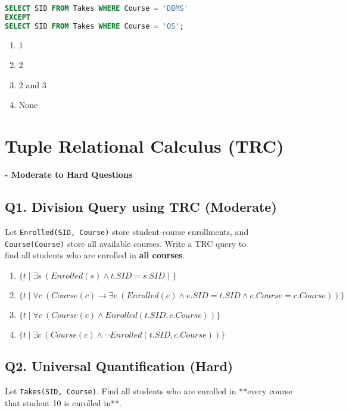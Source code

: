 \begin{lstlisting}[language=SQL]
SELECT SID FROM Takes WHERE Course = 'DBMS'
EXCEPT
SELECT SID FROM Takes WHERE Course = 'OS';
\end{lstlisting}

\begin{enumerate}[label=(\alph*)]
    \item 1
    \item 2
    \item 2 and 3
    \item None
\end{enumerate}

\newpage
\section{Tuple Relational Calculus (TRC)}
\textbf{- Moderate to Hard Questions}

\subsection*{Q1. Division Query using TRC (Moderate)}
Let \texttt{Enrolled(SID, Course)} store student-course enrollments, and\\ 
\texttt{Course(Course)} store all available courses. Write a TRC query to\\ 
find all students who are enrolled in \textbf{all courses}.

\begin{enumerate}[label=(\alph*)]
    \item $\{ t \mid \exists s\ (Enrolled(s) \wedge t.SID = s.SID)\}$
    \item $\{ t \mid \forall c\ (Course(c) \rightarrow \exists e\ (Enrolled(e) \wedge e.SID = t.SID \wedge e.Course = c.Course)) \}$
    \item $\{ t \mid \forall c\ (Course(c) \wedge Enrolled(t.SID, c.Course)) \}$
    \item $\{ t \mid \exists c\ (Course(c) \wedge \neg Enrolled(t.SID, c.Course)) \}$
\end{enumerate}

\subsection*{Q2. Universal Quantification (Hard)}
Let \texttt{Takes(SID, Course)}. Find all students who are enrolled in **every course that student 10 is enrolled in**.

